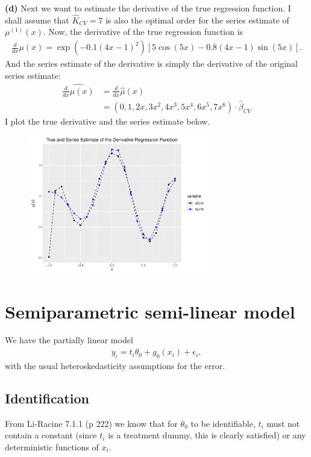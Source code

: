 \documentclass[12pt]{article}
\newcommand{\e}{\epsilon}
\newcommand{\mtx}[1]{\ensuremath{\bm{\mathit{#1}}}}
\begin{document}
\textbf{(d)} Next we want to estimate the derivative of the true regression function. I shall assume that $\hat K_{CV}=7$ is also the optimal order for the series estimate of $\mu^{(1)}(x)$. Now, the derivative of the true regression function is
\begin{align*}
\frac{d}{dx}\mu(x) = \exp(-0.1(4x-1)^2)\left[5 \cos(5x) - 0.8 (4x-1)\sin(5x)\right].
\end{align*}
And the series estimate of the derivative is simply the derivative of the original series estimate:
\begin{align*}
\widehat{\frac{d}{dx}\mu(x)}&=\frac{d}{dx}\hat \mu(x)\\
&=(0,1,2x,3x^2,4x^3,5x^4,6x^5,7x^6) \cdot \hat{\beta}_{CV}
\end{align*}
I plot the true derivative and the series estimate below.

\begin{figure}[h!]
    \centering
    
        \includegraphics[width=0.7\textwidth]{Q2_diagder.pdf}
\end{figure}



\newpage

\section{Semiparametric semi-linear model}
We have the partially linear model
\begin{align}
y_i = t_i \theta_0 + g_0(\mtx{x_i}) + \e_i, \label{eq:3a}
\end{align}
with the usual heteroskedasticity assumptions for the error.
\subsection{Identification}
From Li-Racine 7.1.1 (p 222) we know that for $\theta_0$ to be identifiable, $t_i$ must not contain a constant (since $t_i$ is a treatment dummy, this is clearly satisfied) or any deterministic functions of $\mtx{x}_i$. 
\end{document}
